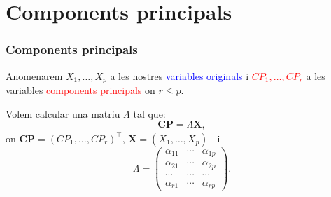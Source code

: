 \documentclass[12pt,t]{beamer}
\newcommand{\red}[1]{\textcolor{red}{#1}}
\newcommand{\blue}[1]{\textcolor{blue}{#1}}
\renewcommand{\leq}{\leqslant}
\theoremstyle{plain}
\theoremstyle{definition}
\begin{document}

\section{Components principals}
\begin{frame}
\frametitle{Components principals}

Anomenarem $X_1,\ldots,X_p$ a les nostres \blue{variables originals} i \red{$CP_1,\ldots,CP_r$} a les variables \red{components principals} on $r\leq p$.
\medskip

Volem calcular una matriu ${\Lambda}$ tal que:
\[
\mathbf{CP}={\Lambda}\mathbf{X},
\]
on $\mathbf{CP}=(CP_1,\ldots,CP_r)^\top$, $\mathbf{X}=(X_1,\ldots,X_p)^\top$ i 
\[
{\Lambda}=\begin{pmatrix}
\alpha_{11}&\cdots & \alpha_{1p}\\
\alpha_{21}&\cdots & \alpha_{2p}\\
\cdots & \cdots & \cdots \\
\alpha_{r1}&\cdots & \alpha_{rp}
\end{pmatrix}.
\]
\end{frame}
\end{document}
